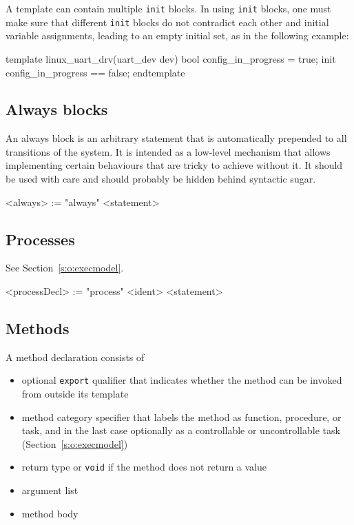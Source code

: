 \documentclass{report}
\newcommand{\src}[1]{\texttt{#1}}
\begin{document}
A template can contain multiple \src{init} blocks.  In using 
\src{init} blocks, one must make sure that different \src{init} 
blocks do not contradict each other and initial variable 
assignments, leading to an empty initial set, as in the following 
example:
\begin{tsllisting}{}
template linux_uart_drv(uart_dev dev)
    bool config_in_progress = true;
    init config_in_progress == false;
endtemplate
\end{tsllisting}

\subsection{Always blocks}\label{s:r:always}

An always block is an arbitrary statement that is automatically 
prepended to all transitions of the system.  It is intended as a 
low-level mechanism that allows implementing certain behaviours 
that are tricky to achieve without it.  It should be used with 
care and should probably be hidden behind syntactic sugar.

\begin{bnflisting}{}
<always> := "always" <statement>
\end{bnflisting}

\subsection{Processes}

See Section~\ref{s:o:execmodel}.

\begin{bnflisting}{}
<processDecl> := "process" <ident> <statement>
\end{bnflisting}

\subsection{Methods}\label{s:r:method}

A method declaration consists of
\begin{itemize}
    \item optional \src{export} qualifier that indicates whether 
        the method can be invoked from outside its template
    \item method category specifier that labels the method as 
        function, procedure, or task, and in the last case 
        optionally as a controllable or uncontrollable task 
        (Section~\ref{s:o:execmodel})
    \item return type or \src{void} if the method does not return 
        a value
    \item argument list
    \item method body
\end{itemize}
\end{document}
